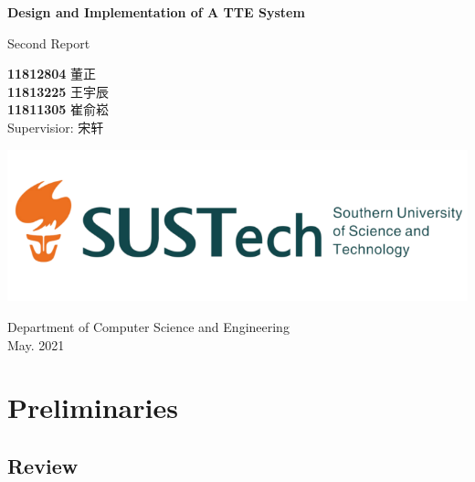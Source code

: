\documentclass[fontset=none]{ctexart}
\theoremstyle{definition}
\theoremstyle{remark}
\begin{document}
\begin{titlepage}
    \begin{center}
        \vspace*{1cm}
            
        \Huge
        \textbf{Design and Implementation of A TTE System}
            
        \vspace{0.5cm}
        \LARGE
        Second Report\\
            
        \vspace{1.5cm}
            
        \textbf{11812804}  董\quad 正\\
        \textbf{11813225}  王宇辰\\
        \textbf{11811305}  崔俞崧\\

        \vspace{0.5cm}
        Supervisior: 宋轩
            
        \vfill
            
        \includegraphics[width=\textwidth]{images/sustc.png}
            
        \vspace{0.2cm}
            
        \Large
        Department of Computer Science and Engineering\\
        \vspace{0.5cm}
        May. 2021
            
    \end{center}
\end{titlepage}

\tableofcontents

\clearpage
\section{Preliminaries}
\subsection{Review}
\end{document}
